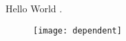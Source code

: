 \documentclass{article}
\begin{document}
Hello World \cite{ref1}.

\begin{figure}
  \centering
  \texttt{[image: dependent]}
\end{figure}





\end{document}
